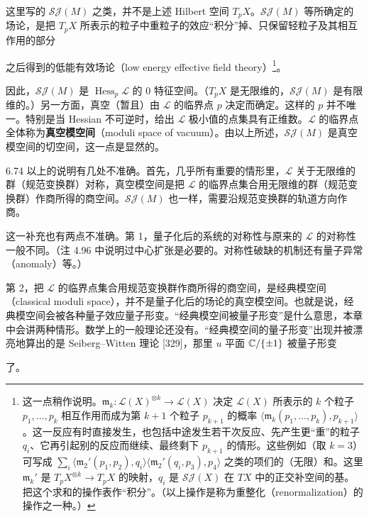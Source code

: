 这里写的 $\mathcal{SJ}(M)$ 之类，并不是上述 Hilbert 空间 $T_pX$。$\mathcal{SJ}(M)$ 等所确定的场论，是把 $T_pX$ 所表示的粒子中重粒子的效应“积分”掉、只保留轻粒子及其相互作用的部分

之后得到的低能有效场论（low energy effective field theory）\footnote{这一点稍作说明。$\mathfrak{m}_k\colon \mathcal{L}(X)^{\otimes k}\to\mathcal{L}(X)$ 决定 $\mathcal{L}(X)$ 所表示的 $k$ 个粒子 $p_1,\dots,p_k$ 相互作用而成为第 $k+1$ 个粒子 $p_{k+1}$ 的概率 $\langle\mathfrak{m}_k(p_1,\dots,p_k),p_{k+1}\rangle$。这一反应有时直接发生，也包括中途发生若干次反应、先产生更“重”的粒子 $q_i$、它再引起别的反应而继续、最终剩下 $p_{k+1}$ 的情形。这些例如（取 $k=3$）可写成 $\sum_i\langle\mathfrak{m}_2'(p_1,p_2),q_i\rangle\langle\mathfrak{m}_2'(q_i,p_3),p_4\rangle$ 之类的项们的（无限）和。这里 $\mathfrak{m}_k'$ 是 $T_pX^{\otimes k}\to T_pX$ 的映射，$q_i$ 是 $\mathcal{SJ}(X)$ 在 $TX$ 中的正交补空间的基。把这个求和的操作表作“积分”。（以上操作是称为重整化（renormalization）的操作之一种。）}。

因此，$\mathcal{SJ}(M)$ 是 $\operatorname{Hess}_p\mathcal{L}$ 的 $0$ 特征空间。（$T_pX$ 是无限维的，$\mathcal{SJ}(M)$ 是有限维的。）另一方面，真空（暂且）由 $\mathcal{L}$ 的临界点 $p$ 决定而确定。这样的 $p$ 并不唯一。特别是当 Hessian 不可逆时，给出 $\mathcal{L}$ 极小值的点集具有正维数。$\mathcal{L}$ 的临界点全体称为\textbf{真空模空间}（moduli space of vacuum）。由以上所述，$\mathcal{SJ}(M)$ 是真空模空间的切空间，这一点是显然的。

\begin{remark}{6.74}
  以上的说明有几处不准确。首先，几乎所有重要的情形里，$\mathcal{L}$ 关于无限维的群（规范变换群）对称，真空模空间是把 $\mathcal{L}$ 的临界点集合用无限维的群（规范变换群）作商所得的商空间。$\mathcal{SJ}(M)$ 也一样，需要沿规范变换群的轨道方向作商。

  这一补充也有两点不准确。第 1，量子化后的系统的对称性与原来的 $\mathcal{L}$ 的对称性一般不同。（注 4.96 中说明过中心扩张是必要的。对称性破缺的机制还有量子异常（anomaly）等。）

  第 2，把 $\mathcal{L}$ 的临界点集合用规范变换群作商所得的商空间，是经典模空间（classical moduli space），并不是量子化后的场论的真空模空间。也就是说，经典模空间会被各种量子效应量子形变。“经典模空间被量子形变”是什么意思，本章中会讲两种情形。数学上的一般理论还没有。“经典模空间的量子形变”出现并被漂亮地算出的是 Seiberg–Witten 理论 [329]，那里 $u$ 平面 $\mathbb{C}/\{\pm1\}$ 被量子形变
\end{remark}

了。

